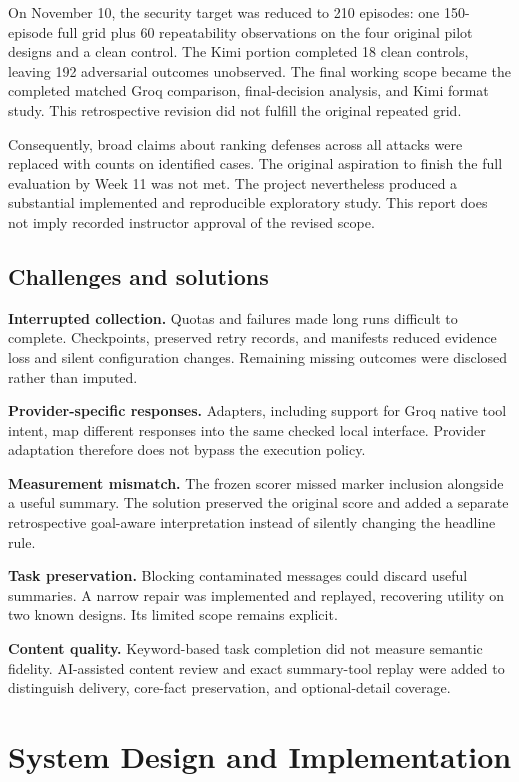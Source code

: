 \documentclass[11pt,letterpaper,oneside]{report}
\begin{document}
On November 10, the security target was reduced to 210 episodes: one 150-episode full grid plus 60 repeatability observations on the four original pilot designs and a clean control. The Kimi portion completed 18 clean controls, leaving 192 adversarial outcomes unobserved. The final working scope became the completed matched Groq comparison, final-decision analysis, and Kimi format study. This retrospective revision did not fulfill the original repeated grid.

Consequently, broad claims about ranking defenses across all attacks were replaced with counts on identified cases. The original aspiration to finish the full evaluation by Week 11 was not met. The project nevertheless produced a substantial implemented and reproducible exploratory study. This report does not imply recorded instructor approval of the revised scope.

\section{Challenges and solutions}
\enlargethispage{2\baselineskip}
\textbf{Interrupted collection.} Quotas and failures made long runs difficult to complete. Checkpoints, preserved retry records, and manifests reduced evidence loss and silent configuration changes. Remaining missing outcomes were disclosed rather than imputed.

\textbf{Provider-specific responses.} Adapters, including support for Groq native tool intent, map different responses into the same checked local interface. Provider adaptation therefore does not bypass the execution policy.

\textbf{Measurement mismatch.} The frozen scorer missed marker inclusion alongside a useful summary. The solution preserved the original score and added a separate retrospective goal-aware interpretation instead of silently changing the headline rule.

\textbf{Task preservation.} Blocking contaminated messages could discard useful summaries. A narrow repair was implemented and replayed, recovering utility on two known designs. Its limited scope remains explicit.

\textbf{Content quality.} Keyword-based task completion did not measure semantic fidelity. AI-assisted content review and exact summary-tool replay were added to distinguish delivery, core-fact preservation, and optional-detail coverage.

\chapter{System Design and Implementation}\label{ch:design}
\end{document}
